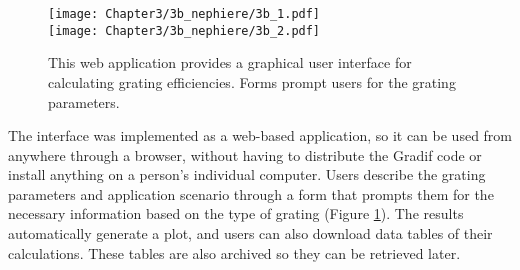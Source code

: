 \begin{figure}[htbp] %
   \centering
   \texttt{[image: Chapter3/3b\_nephiere/3b\_1.pdf]} \\
   \texttt{[image: Chapter3/3b\_nephiere/3b\_2.pdf]}
   \caption{This web application provides a graphical user interface for calculating grating efficiencies. Forms prompt users for the grating parameters.}
   \label{3b}
\end{figure}

The interface was implemented as a web-based application, so it can be used from anywhere through a browser, without having to distribute the Gradif code or install anything on a person's individual computer.  Users describe the grating parameters and application scenario through a form that prompts them for the necessary information based on the type of grating (Figure \ref{3b}).  The results automatically generate a plot, and users can also download data tables of their calculations.  These tables are also archived so they can be retrieved later.

